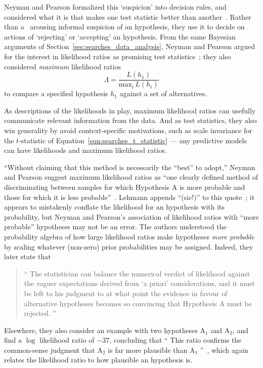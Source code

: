 Neyman and Pearson formalized this `suspicion' into decision rules,
and considered what it is that makes one test statistic better than
another~\cite{neymanpearson1928max, neymanpearson1933lemma}.
Rather than a \pvalue\ arousing informal suspicion of an hypothesis, they use it
to decide on actions of `rejecting' or `accepting' an hypothesis.
From the same Bayesian arguments of Section~\ref{sec:searches_data_analysis},
Neyman and Pearson argued for the interest in likelihood ratios as promising
test statistics~\cite{neymanpearson1928max};
they also considered \emph{maximum} likelihood ratios
\begin{equation}
\label{eqn:searches_max_like_ratio}
\Lambda =
\frac{L(h_1)}{\mathrm{max}_i\,L(h_i)}
\end{equation}
to compare a specified hypothesis $h_1$ against a set of alternatives.

As descriptions of the likelihoods in play, maximum likelihood ratios can
usefully communicate relevant information from the data.
And as test statistics, they also win generality by avoid context-specific
motivations, such as scale invariance for the $t$-statistic of
Equation~\ref{eqn:searches_t_statistic} --- any predictive models can have
likelihoods and maximum likelihood ratios.

``Without claiming that this method is necessarily the ``best'' to adopt,''
Neyman and Pearson suggest maximum likelihood ratios as
``one clearly defined method of discriminating between samples for which
Hypothesis A is more probable and those for which it is less probable''~\cite{
neymanpearson1933lemma}.
Lehmann appends ``(sic!)'' to this quote~\cite{lehmann2011fisher};
it appears to mistakenly conflate the likelihood for an hypothesis with its
probability, but Neyman and Pearson's association of likelihood ratios with
``more probable'' hypotheses may not be an error.
The authors understood the probability algebra of how large likelihood ratios
make hypotheses \emph{more probable} by scaling whatever (non-zero) prior
probabilities may be assigned.
Indeed, they later state that
\begin{quote}
``%
The statistician can balance the numerical verdict of likelihood against the
vaguer expectations derived from `a priori' considerations, and it must be left
to his judgment to at what point the evidence in favour of alternative
hypotheses becomes so convincing that Hypothesis A must be rejected.%
''~\cite{neymanpearson1933lemma}
\end{quote}
Elsewhere, they also consider an example with two hypotheses $\mathrm{A}_1$
and $\mathrm{A}_2$, and find a $\log$ likelihood ratio of
$-37$, concluding that
``%
This ratio confirms the common-sense judgment that $\mathrm{A}_2$ is far more
plausible than $\mathrm{A}_1$%
''~\cite{neymanpearson1928max},
which again relates the likelihood ratio to how plausible an hypothesis is.

